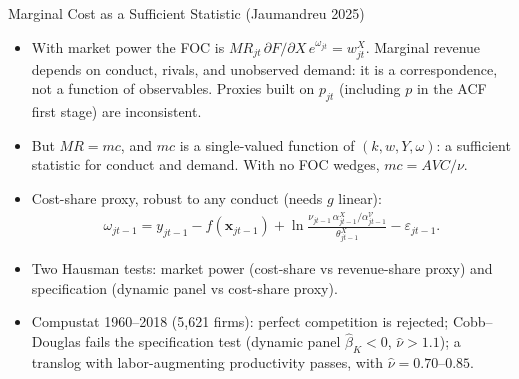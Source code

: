\documentclass[aspectratio=169,10pt]{beamer}
\begin{document}
\begin{frame}{Marginal Cost as a Sufficient Statistic (Jaumandreu 2025)}
\begin{itemize}
\item With market power the FOC is $MR_{jt}\, \partial F/\partial X\, e^{\omega_{jt}} = w^X_{jt}$. Marginal revenue depends on conduct, rivals, and unobserved demand: it is a correspondence, not a function of observables. Proxies built on $p_{jt}$ (including $p$ in the ACF first stage) are inconsistent.
\item But $MR = mc$, and $mc$ is a single-valued function of $(k, w, Y, \omega)$: a \alert{sufficient statistic} for conduct and demand. With no FOC wedges, $mc = AVC/\nu$.
\item Cost-share proxy, robust to any conduct (needs $g$ linear):
\begin{align*}
\omega_{jt-1} = y_{jt-1} - f(\mathbf{x}_{jt-1}) + \ln\frac{\nu_{jt-1}\, \alpha^X_{jt-1}/\alpha^{\mathcal{V}}_{jt-1}}{\theta^X_{jt-1}} - \varepsilon_{jt-1}.
\end{align*}
\item Two Hausman tests: market power (cost-share vs revenue-share proxy) and specification (dynamic panel vs cost-share proxy).
\item Compustat 1960--2018 (5,621 firms): perfect competition is rejected; Cobb--Douglas fails the specification test (dynamic panel $\hat\beta_K < 0$, $\hat\nu > 1.1$); a translog with labor-augmenting productivity passes, with $\hat\nu = 0.70$--$0.85$.
\end{itemize}
\end{frame}
\end{document}
